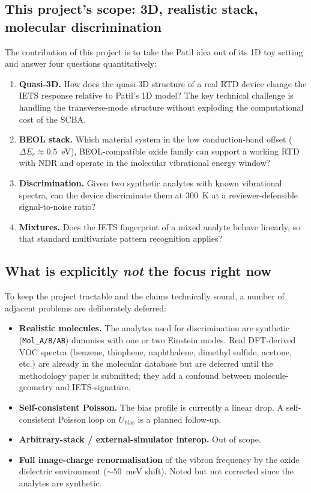 \documentclass[11pt,a4paper,onecolumn]{article}
\newcommand{\code}[1]{\texttt{\small #1}}
\begin{document}
\subsection{This project's scope: 3D, realistic stack, molecular
discrimination}
The contribution of this project is to take the Patil idea out of its 1D
toy setting and answer four questions quantitatively:
\begin{enumerate}[leftmargin=1.3em,itemsep=2pt]
\item \textbf{Quasi-3D.} How does the quasi-3D structure of a real RTD
device change the IETS response relative to Patil's 1D model? The key
technical challenge is handling the transverse-mode structure without
exploding the computational cost of the SCBA.
\item \textbf{BEOL stack.} Which material system in the low conduction-band
offset ($\Delta E_c \!\approx\! 0.5$~eV), BEOL-compatible oxide family can
support a working RTD with NDR and operate in the molecular vibrational
energy window?
\item \textbf{Discrimination.} Given two synthetic analytes with known
vibrational spectra, can the device discriminate them at 300~K at a
reviewer-defensible signal-to-noise ratio?
\item \textbf{Mixtures.} Does the IETS fingerprint of a mixed analyte
behave linearly, so that standard multivariate pattern recognition applies?
\end{enumerate}

\subsection{What is explicitly \emph{not} the focus right now}
To keep the project tractable and the claims technically sound, a number
of adjacent problems are deliberately deferred:
\begin{itemize}[leftmargin=1.3em]
\item \textbf{Realistic molecules.} The analytes used for discrimination
are synthetic (\code{Mol\_A/B/AB}) dummies with one or two Einstein modes.
Real DFT-derived VOC spectra (benzene, thiophene, naphthalene, dimethyl
sulfide, acetone, etc.) are already in the molecular database but are
deferred until the methodology paper is submitted; they add a confound
between molecule-geometry and IETS-signature.
\item \textbf{Self-consistent Poisson.} The bias profile is currently a
linear drop. A self-consistent Poisson loop on $U_{\mathrm{bias}}$ is a
planned follow-up.
\item \textbf{Arbitrary-stack / external-simulator interop.} Out of scope.
\item \textbf{Full image-charge renormalisation} of the vibron frequency
by the oxide dielectric environment ($\sim 50$~meV shift). Noted but not
corrected since the analytes are synthetic.
\end{itemize}
\end{document}
